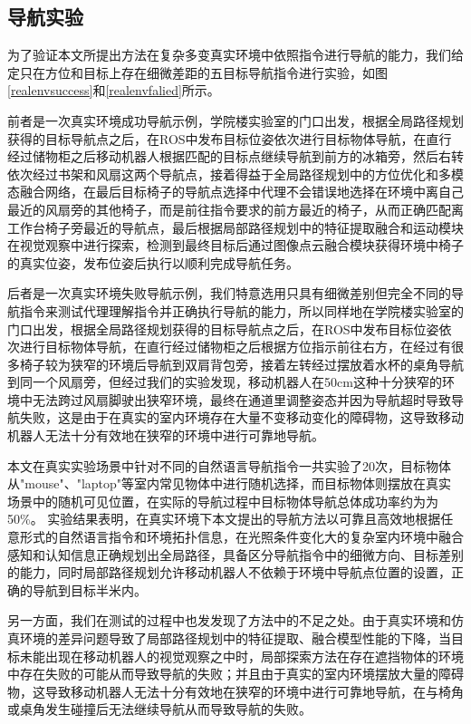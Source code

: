 \subsection{导航实验}
为了验证本文所提出方法在复杂多变真实环境中依照指令进行导航的能力，我们给定只在方位和目标上存在细微差距的五目标导航指令进行实验，如图\ref{realenvsuccess}和\ref{realenvfalied}所示。


前者是一次真实环境成功导航示例，学院楼实验室的门口出发，根据全局路径规划获得的目标导航点之后，在ROS中发布目标位姿依次进行目标物体导航，在直行经过储物柜之后移动机器人根据匹配的目标点继续导航到前方的冰箱旁，然后右转依次经过书架和风扇这两个导航点，接着得益于全局路径规划中的方位优化和多模态融合网络，在最后目标椅子的导航点选择中代理不会错误地选择在环境中离自己最近的风扇旁的其他椅子，而是前往指令要求的前方最近的椅子，从而正确匹配离工作台椅子旁最近的导航点，最后根据局部路径规划中的特征提取融合和运动模块在视觉观察中进行探索，检测到最终目标后通过图像点云融合模块获得环境中椅子的真实位姿，发布位姿后执行以顺利完成导航任务。

后者是一次真实环境失败导航示例，我们特意选用只具有细微差别但完全不同的导航指令来测试代理理解指令并正确执行导航的能力，所以同样地在学院楼实验室的门口出发，根据全局路径规划获得的目标导航点之后，在ROS中发布目标位姿依次进行目标物体导航，在直行经过储物柜之后根据方位指示前往右方，在经过有很多椅子较为狭窄的环境后导航到双肩背包旁，接着左转经过摆放着水杯的桌角导航到同一个风扇旁，但经过我们的实验发现，移动机器人在50cm这种十分狭窄的环境中无法跨过风扇脚驶出狭窄环境，最终在通道里调整姿态并因为导航超时导致导航失败，这是由于在真实的室内环境存在大量不变移动变化的障碍物，这导致移动机器人无法十分有效地在狭窄的环境中进行可靠地导航。



本文在真实实验场景中针对不同的自然语言导航指令一共实验了20次，目标物体从"mouse"、"laptop"等室内常见物体中进行随机选择，而目标物体则摆放在真实场景中的随机可见位置，在实际的导航过程中目标物体导航总体成功率约为为50\%。
实验结果表明，在真实环境下本文提出的导航方法以可靠且高效地根据任意形式的自然语言指令和环境拓扑信息，在光照条件变化大的复杂室内环境中融合感知和认知信息正确规划出全局路径，具备区分导航指令中的细微方向、目标差别的能力，同时局部路径规划允许移动机器人不依赖于环境中导航点位置的设置，正确的导航到目标半米内。

另一方面，我们在测试的过程中也发发现了方法中的不足之处。由于真实环境和仿真环境的差异问题导致了局部路径规划中的特征提取、融合模型性能的下降，当目标未能出现在移动机器人的视觉观察之中时，局部探索方法在存在遮挡物体的环境中存在失败的可能从而导致导航的失败；并且由于真实的室内环境摆放大量的障碍物，这导致移动机器人无法十分有效地在狭窄的环境中进行可靠地导航，在与椅角或桌角发生碰撞后无法继续导航从而导致导航的失败。


